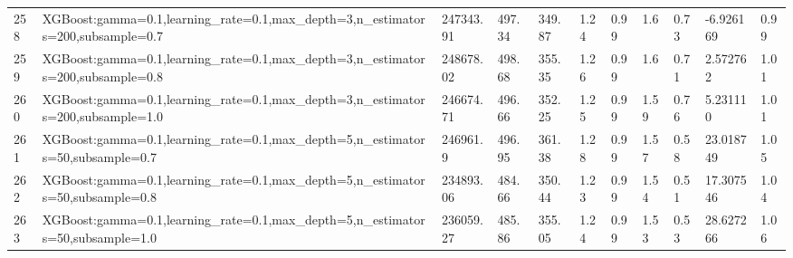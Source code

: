 \begin{longtable}{C{0.8cm} L{2cm} C{1.15cm} C{1.15cm} C{1.15cm} C{1.15cm} C{0.85cm} C{1.25cm} C{1.2cm} C{1.5cm} C{1.0cm}}
258 & XGBoost:\newline gamma=0.1,\newline learning\_rate=0.1,\newline max\_depth=3,\newline n\_estimators=200,\newline subsample=0.7 & 247343.91 & 497.34 & 349.87 & 1.24 & 0.99 & 1.6 & 0.73 & -6.926169 & 0.99 \\
259 & XGBoost:\newline gamma=0.1,\newline learning\_rate=0.1,\newline max\_depth=3,\newline n\_estimators=200,\newline subsample=0.8 & 248678.02 & 498.68 & 355.35 & 1.26 & 0.99 & 1.6 & 0.71 & 2.572762 & 1.01 \\
260 & XGBoost:\newline gamma=0.1,\newline learning\_rate=0.1,\newline max\_depth=3,\newline n\_estimators=200,\newline subsample=1.0 & 246674.71 & 496.66 & 352.25 & 1.25 & 0.99 & 1.59 & 0.76 & 5.231110 & 1.01 \\
261 & XGBoost:\newline gamma=0.1,\newline learning\_rate=0.1,\newline max\_depth=5,\newline n\_estimators=50,\newline subsample=0.7 & 246961.9 & 496.95 & 361.38 & 1.28 & 0.99 & 1.57 & 0.58 & 23.018749 & 1.05 \\
262 & XGBoost:\newline gamma=0.1,\newline learning\_rate=0.1,\newline max\_depth=5,\newline n\_estimators=50,\newline subsample=0.8 & 234893.06 & 484.66 & 350.44 & 1.23 & 0.99 & 1.54 & 0.51 & 17.307546 & 1.04 \\
263 & XGBoost:\newline gamma=0.1,\newline learning\_rate=0.1,\newline max\_depth=5,\newline n\_estimators=50,\newline subsample=1.0 & 236059.27 & 485.86 & 355.05 & 1.24 & 0.99 & 1.53 & 0.53 & 28.627266 & 1.06 \\

\end{longtable}
